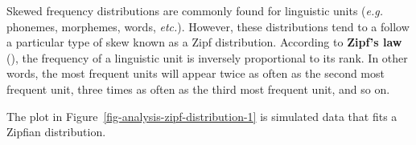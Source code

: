 \documentclass[
  letterpaper,
  krantz1]{latex/krantz-mod}
\theoremstyle{definition}
\theoremstyle{definition}
\theoremstyle{remark}
\begin{document}
Skewed frequency distributions are commonly found for linguistic units
(\emph{e.g.} phonemes, morphemes, words, \emph{etc.}). However, these
distributions tend to a follow a particular type of skew known as a Zipf
distribution. According to \textbf{Zipf's law}
(), the frequency of
a linguistic unit is inversely proportional to its rank. In other words,
the most frequent units will appear twice as often as the second most
frequent unit, three times as often as the third most frequent unit, and
so on.

The plot in Figure~\ref{fig-analysis-zipf-distribution-1} is simulated
data that fits a Zipfian distribution.

\begin{figure}[!htb]

\begin{minipage}{0.50\linewidth}



\end{minipage}%
%
\begin{minipage}{0.50\linewidth}

\centering{

}
\end{minipage}
\end{figure}
\end{document}
